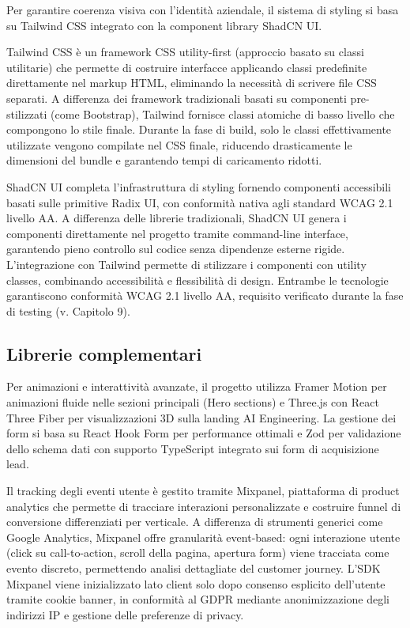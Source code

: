 Per garantire coerenza visiva con l'identità aziendale, il sistema di styling 
si basa su Tailwind CSS integrato con la component library ShadCN UI.

Tailwind CSS è un framework CSS utility-first (approccio basato su classi 
utilitarie) che permette di costruire interfacce applicando classi predefinite 
direttamente nel markup HTML, eliminando la necessità di scrivere file CSS 
separati. A differenza dei framework tradizionali basati su componenti 
pre-stilizzati (come Bootstrap), Tailwind fornisce classi atomiche di basso 
livello che compongono lo stile finale. Durante la fase di build, solo le 
classi effettivamente utilizzate vengono compilate nel CSS finale, riducendo 
drasticamente le dimensioni del bundle e garantendo tempi di caricamento ridotti.

ShadCN UI completa l'infrastruttura di styling fornendo componenti accessibili 
basati sulle primitive Radix UI, con conformità nativa agli standard WCAG 2.1 
livello AA. A differenza delle librerie tradizionali, ShadCN UI genera i 
componenti direttamente nel progetto tramite command-line interface, garantendo 
pieno controllo sul codice senza dipendenze esterne rigide. L'integrazione con 
Tailwind permette di stilizzare i componenti con utility classes, combinando 
accessibilità e flessibilità di design. Entrambe le tecnologie garantiscono 
conformità WCAG 2.1 livello AA, requisito verificato durante la fase di 
testing (v. Capitolo 9).

\subsection{Librerie complementari}

Per animazioni e interattività avanzate, il progetto utilizza Framer Motion per 
animazioni fluide nelle sezioni principali (Hero sections) e Three.js con React 
Three Fiber per visualizzazioni 3D sulla landing AI Engineering. La gestione dei 
form si basa su React Hook Form per performance ottimali e Zod per validazione 
dello schema dati con supporto TypeScript integrato sui form di acquisizione lead.

Il tracking degli eventi utente è gestito tramite Mixpanel, piattaforma di 
product analytics che permette di tracciare interazioni personalizzate e 
costruire funnel di conversione differenziati per verticale. A differenza di 
strumenti generici come Google Analytics, Mixpanel offre granularità event-based: 
ogni interazione utente (click su call-to-action, scroll della pagina, apertura 
form) viene tracciata come evento discreto, permettendo analisi dettagliate del 
customer journey. L'SDK Mixpanel viene inizializzato lato client solo dopo 
consenso esplicito dell'utente tramite cookie banner, in conformità al GDPR 
mediante anonimizzazione degli indirizzi IP e gestione delle preferenze di 
privacy.

